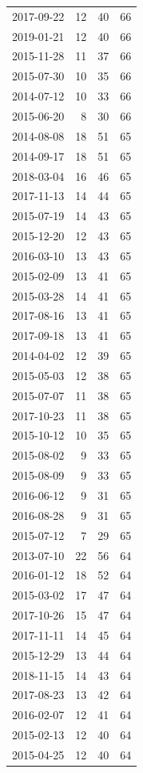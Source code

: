 \begin{tabular}{lrrr}
2017-09-22 & 12 & 40 & 66 \\
2019-01-21 & 12 & 40 & 66 \\
2015-11-28 & 11 & 37 & 66 \\
2015-07-30 & 10 & 35 & 66 \\
2014-07-12 & 10 & 33 & 66 \\
2015-06-20 & 8 & 30 & 66 \\
2014-08-08 & 18 & 51 & 65 \\
2014-09-17 & 18 & 51 & 65 \\
2018-03-04 & 16 & 46 & 65 \\
2017-11-13 & 14 & 44 & 65 \\
2015-07-19 & 14 & 43 & 65 \\
2015-12-20 & 12 & 43 & 65 \\
2016-03-10 & 13 & 43 & 65 \\
2015-02-09 & 13 & 41 & 65 \\
2015-03-28 & 14 & 41 & 65 \\
2017-08-16 & 13 & 41 & 65 \\
2017-09-18 & 13 & 41 & 65 \\
2014-04-02 & 12 & 39 & 65 \\
2015-05-03 & 12 & 38 & 65 \\
2015-07-07 & 11 & 38 & 65 \\
2017-10-23 & 11 & 38 & 65 \\
2015-10-12 & 10 & 35 & 65 \\
2015-08-02 & 9 & 33 & 65 \\
2015-08-09 & 9 & 33 & 65 \\
2016-06-12 & 9 & 31 & 65 \\
2016-08-28 & 9 & 31 & 65 \\
2015-07-12 & 7 & 29 & 65 \\
2013-07-10 & 22 & 56 & 64 \\
2016-01-12 & 18 & 52 & 64 \\
2015-03-02 & 17 & 47 & 64 \\
2017-10-26 & 15 & 47 & 64 \\
2017-11-11 & 14 & 45 & 64 \\
2015-12-29 & 13 & 44 & 64 \\
2018-11-15 & 14 & 43 & 64 \\
2017-08-23 & 13 & 42 & 64 \\
2016-02-07 & 12 & 41 & 64 \\
2015-02-13 & 12 & 40 & 64 \\
2015-04-25 & 12 & 40 & 64 \\

\end{tabular}
